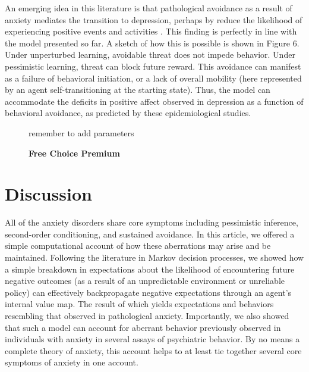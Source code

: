 \documentclass[11pt]{article} %
\begin{document}
An emerging idea in this literature is that pathological avoidance as a result
of anxiety mediates the transition to depression, perhaps by reduce the likelihood
of experiencing positive events and activities \citep{moitra2008, jacobson2014}.
This finding is perfectly in line with the model presented so far. A sketch of
how this is possible is shown in Figure 6. Under unperturbed learning, avoidable
threat does not impede behavior. Under pessimistic learning, threat can block
future reward. This avoidance can manifest as a failure of behavioral initiation,
or a lack of overall mobility (here represented by an agent self-transitioning
at the starting state). Thus, the model can accommodate the deficits in positive
affect observed in depression as a function of behavioral avoidance, as predicted
by these epidemiological studies.

\begin{figure}
  \centerline{%
  }
  \caption{\textbf{Free Choice Premium}}
  \par remember to add parameters
\end{figure}

\section{Discussion}

All of the anxiety disorders share core symptoms including pessimistic inference,
second-order conditioning, and sustained avoidance. In this article, we offered
a simple computational account of how these aberrations may arise and be maintained.
Following the literature in Markov decision processes, we showed how a simple
breakdown in expectations about the likelihood of encountering future negative
outcomes (as a result of an unpredictable environment or unreliable policy) can
effectively backpropagate negative expectations through an agent's internal value
map. The result of which yields expectations and behaviors resembling that observed
in pathological anxiety. Importantly, we also showed that such a model can account
for aberrant behavior previously observed in individuals with anxiety in several
assays of psychiatric behavior. By no means a complete theory of anxiety, this
account helps to at least tie together several core symptoms of anxiety in one
account.
\end{document}
